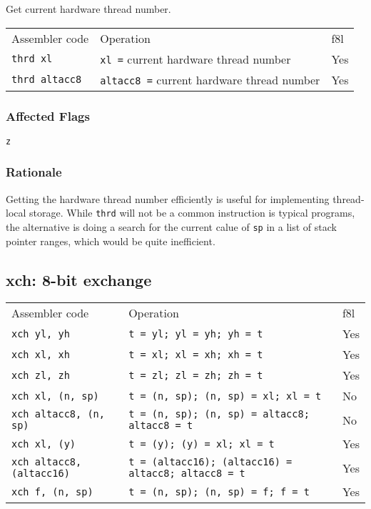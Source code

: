 \documentclass{book}
\begin{document}
Get current hardware thread number.

\begin{tabular}{l l l}
Assembler code        & Operation                                         & f8l \\
\texttt{thrd xl}      & \texttt{xl =} current hardware thread number      & Yes \\
\texttt{thrd altacc8} & \texttt{altacc8 =} current hardware thread number & Yes \\
\end{tabular}

\subsubsection*{Affected Flags}

\texttt{z}

\subsubsection*{Rationale}

Getting the hardware thread number efficiently is useful for implementing thread-local storage. While \texttt{thrd} will not be a common instruction is typical programs, the alternative is doing a search for the current calue of \texttt{sp} in a list of stack pointer ranges, which would be quite inefficient.

\subsection{xch: 8-bit exchange}

\begin{tabular}{l l l}
Assembler code                   & Operation                                                  & f8l \\
\texttt{xch yl, yh}              & \texttt{t = yl; yl = yh; yh = t}                           & Yes \\
\texttt{xch xl, xh}              & \texttt{t = xl; xl = xh; xh = t}                           & Yes \\
\texttt{xch zl, zh}              & \texttt{t = zl; zl = zh; zh = t}                           & Yes \\
\texttt{xch xl, (n, sp)}         & \texttt{t = (n, sp); (n, sp) = xl; xl = t}                 & No \\
\texttt{xch altacc8, (n, sp)}    & \texttt{t = (n, sp); (n, sp) = altacc8; altacc8 = t}       & No \\
\texttt{xch xl, (y)}             & \texttt{t = (y); (y) = xl; xl = t}                         & Yes \\
\texttt{xch altacc8, (altacc16)} & \texttt{t = (altacc16); (altacc16) = altacc8; altacc8 = t} & Yes \\
\texttt{xch f, (n, sp)}          & \texttt{t = (n, sp); (n, sp) = f; f = t}                   & Yes
\end{tabular}
\end{document}
